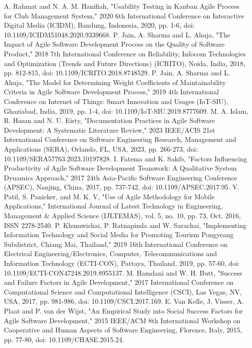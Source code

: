 \documentclass[conference]{IEEEtran}
\begin{document}
\begin{thebibliography}{00}
     A. Rahmat and N. A. M. Hanifiah, "Usability Testing in Kanban Agile Process for Club Management System," 2020 6th International Conference on Interactive Digital Media (ICIDM), Bandung, Indonesia, 2020, pp. 1-6, doi: 10.1109/ICIDM51048.2020.9339668. 
     P. Jain, A. Sharma and L. Ahuja, "The Impact of Agile Software Development Process on the Quality of Software Product," 2018 7th International Conference on Reliability, Infocom Technologies and Optimization (Trends and Future Directions) (ICRITO), Noida, India, 2018, pp. 812-815, doi: 10.1109/ICRITO.2018.8748529. 
     P. Jain, A. Sharma and L. Ahuja, "The Model for Determining Weight Coefficients of Maintainability Criteria in Agile Software Development Process," 2019 4th International Conference on Internet of Things: Smart Innovation and Usages (IoT-SIU), Ghaziabad, India, 2019, pp. 1-4, doi: 10.1109/IoT-SIU.2019.8777609. 
     M. A. Islam, R. Hasan and N. U. Eisty, "Documentation Practices in Agile Software Development: A Systematic Literature Review," 2023 IEEE/ACIS 21st International Conference on Software Engineering Research, Management and Applications (SERA), Orlando, FL, USA, 2023, pp. 266-273, doi: 10.1109/SERA57763.2023.10197828. 
     I. Fatema and K. Sakib, "Factors Influencing Productivity of Agile Software Development Teamwork: A Qualitative System Dynamics Approach," 2017 24th Asia-Pacific Software Engineering Conference (APSEC), Nanjing, China, 2017, pp. 737-742, doi: 10.1109/APSEC.2017.95. 
     V. Patil, S. Panicker, and M. K. V, "Use of Agile Methodology for Mobile Applications," International Journal of Latest Technology in Engineering, Management \& Applied Science (IJLTEMAS), vol. 5, no. 10, pp. 73, Oct. 2016, ISSN 2278-2540.
     P. Khumwichai, P. Ratnapinda and W. Sarachai, "Implementing Information Technology and Social Media for Promoting Tourism Pongyeang Subdistrict, Chiang Mai, Thailand," 2019 16th International Conference on Electrical Engineering/Electronics, Computer, Telecommunications and Information Technology (ECTI-CON), Pattaya, Thailand, 2019, pp. 57-60, doi: 10.1109/ECTI-CON47248.2019.8955137.
     M. Hamdani and W. H. Butt, "Success and Failure Factors in Agile Development," 2017 International Conference on Computational Science and Computational Intelligence (CSCI), Las Vegas, NV, USA, 2017, pp. 981-986, doi: 10.1109/CSCI.2017.169.
     E. Van Kelle, J. Visser, A. Plaat and P. van der Wijst, "An Empirical Study into Social Success Factors for Agile Software Development," 2015 IEEE/ACM 8th International Workshop on Cooperative and Human Aspects of Software Engineering, Florence, Italy, 2015, pp. 77-80, doi: 10.1109/CHASE.2015.24.

\end{thebibliography}
\end{document}

